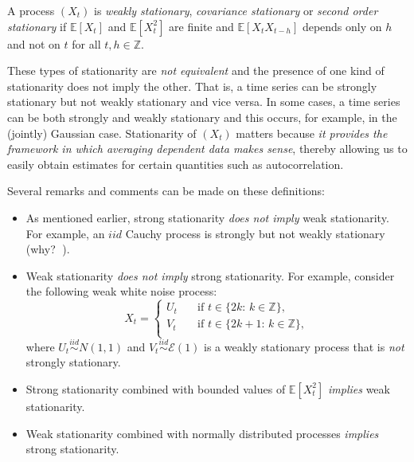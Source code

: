 \documentclass[]{book}
\theoremstyle{definition}
\theoremstyle{definition}
\theoremstyle{definition}
\theoremstyle{remark}
\let\BeginKnitrBlock\begin \let\EndKnitrBlock\end
\begin{document}
\BeginKnitrBlock{definition}
\protect\hypertarget{def:weakstationarity}{}{\label{def:weakstationarity} }A
process \((X_t)\) is \emph{weakly stationary}, \emph{covariance
stationary} or \emph{second order stationary} if \(\mathbb{E}[X_t]\) and
\(\mathbb{E}[X_t^2]\) are finite and \(\mathbb{E}[X_t X_{t-h}]\) depends
only on \(h\) and not on \(t\) for all \(t,h \in \mathbb{Z}\).
\EndKnitrBlock{definition}

These types of stationarity are \emph{not equivalent} and the presence
of one kind of stationarity does not imply the other. That is, a time
series can be strongly stationary but not weakly stationary and vice
versa. In some cases, a time series can be both strongly and weakly
stationary and this occurs, for example, in the (jointly) Gaussian case.
Stationarity of \((X_t)\) matters because \emph{it provides the
framework in which averaging dependent data makes sense}, thereby
allowing us to easily obtain estimates for certain quantities such as
autocorrelation.

Several remarks and comments can be made on these definitions:

\begin{itemize}
\item
  As mentioned earlier, strong stationarity \emph{does not imply} weak
  stationarity. For example, an \(iid\) Cauchy process is strongly but
  not weakly stationary (why? 🤔).
\item
  Weak stationarity \emph{does not imply} strong stationarity. For
  example, consider the following weak white noise process:
  \begin{equation*}
  X_t = \begin{cases}
  U_{t}      & \quad \text{if } t \in \{2k:\, k\in \mathbb{Z} \}, \\
  V_{t}      & \quad \text{if } t \in \{2k+1:\, k\in \mathbb{Z} \},\\
  \end{cases}
  \end{equation*} where
  \({U_t} \mathop \sim \limits^{iid} N\left( {1,1} \right)\) and
  \({V_t}\mathop \sim \limits^{iid} \mathcal{E}\left( 1 \right)\) is a
  weakly stationary process that is \emph{not} strongly stationary.
\item
  Strong stationarity combined with bounded values of
  \(\mathbb{E}[X_t^2]\) \emph{implies} weak stationarity.
\item
  Weak stationarity combined with normally distributed processes
  \emph{implies} strong stationarity.
\end{itemize}
\end{document}
